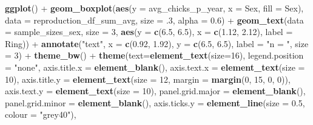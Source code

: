 \documentclass[]{article}
\newenvironment{Shaded}{\begin{snugshade}}{\end{snugshade}}
\newcommand{\KeywordTok}[1]{\textcolor[rgb]{0.13,0.29,0.53}{\textbf{{#1}}}}
\newcommand{\DataTypeTok}[1]{\textcolor[rgb]{0.13,0.29,0.53}{{#1}}}
\newcommand{\DecValTok}[1]{\textcolor[rgb]{0.00,0.00,0.81}{{#1}}}
\newcommand{\FloatTok}[1]{\textcolor[rgb]{0.00,0.00,0.81}{{#1}}}
\newcommand{\StringTok}[1]{\textcolor[rgb]{0.31,0.60,0.02}{{#1}}}
\newcommand{\NormalTok}[1]{{#1}}
\begin{document}
\begin{Shaded}
\begin{Highlighting}[]
\KeywordTok{ggplot}\NormalTok{() +}
\StringTok{  }\KeywordTok{geom_boxplot}\NormalTok{(}\KeywordTok{aes}\NormalTok{(}\DataTypeTok{y =} \NormalTok{avg_chicks_p_year, }\DataTypeTok{x =} \NormalTok{Sex, }\DataTypeTok{fill =} \NormalTok{Sex), }
               \DataTypeTok{data =} \NormalTok{reproduction_df_sum_avg, }\DataTypeTok{size =} \NormalTok{.}\DecValTok{3}\NormalTok{, }\DataTypeTok{alpha =} \FloatTok{0.6}\NormalTok{) +}
\StringTok{  }\KeywordTok{geom_text}\NormalTok{(}\DataTypeTok{data =} \NormalTok{sample_sizes_sex, }\DataTypeTok{size =} \DecValTok{3}\NormalTok{, }
            \KeywordTok{aes}\NormalTok{(}\DataTypeTok{y =} \KeywordTok{c}\NormalTok{(}\FloatTok{6.5}\NormalTok{, }\FloatTok{6.5}\NormalTok{), }\DataTypeTok{x =} \KeywordTok{c}\NormalTok{(}\FloatTok{1.12}\NormalTok{, }\FloatTok{2.12}\NormalTok{), }\DataTypeTok{label =} \NormalTok{Ring)) +}
\StringTok{  }\KeywordTok{annotate}\NormalTok{(}\StringTok{"text"}\NormalTok{, }\DataTypeTok{x =} \KeywordTok{c}\NormalTok{(}\FloatTok{0.92}\NormalTok{, }\FloatTok{1.92}\NormalTok{), }\DataTypeTok{y =} \KeywordTok{c}\NormalTok{(}\FloatTok{6.5}\NormalTok{, }\FloatTok{6.5}\NormalTok{), }\DataTypeTok{label =} \StringTok{"n = "}\NormalTok{, }
           \DataTypeTok{size =} \DecValTok{3}\NormalTok{) +}
\StringTok{  }\KeywordTok{theme_bw}\NormalTok{() +}
\StringTok{  }\KeywordTok{theme}\NormalTok{(}\DataTypeTok{text=}\KeywordTok{element_text}\NormalTok{(}\DataTypeTok{size=}\DecValTok{16}\NormalTok{),}
        \DataTypeTok{legend.position =} \StringTok{"none"}\NormalTok{,}
        \DataTypeTok{axis.title.x =} \KeywordTok{element_blank}\NormalTok{(),}
        \DataTypeTok{axis.text.x  =} \KeywordTok{element_text}\NormalTok{(}\DataTypeTok{size =} \DecValTok{10}\NormalTok{), }
        \DataTypeTok{axis.title.y =} \KeywordTok{element_text}\NormalTok{(}\DataTypeTok{size =} \DecValTok{12}\NormalTok{, }
                                    \DataTypeTok{margin =} \KeywordTok{margin}\NormalTok{(}\DecValTok{0}\NormalTok{, }\DecValTok{15}\NormalTok{, }\DecValTok{0}\NormalTok{, }\DecValTok{0}\NormalTok{)),}
        \DataTypeTok{axis.text.y =} \KeywordTok{element_text}\NormalTok{(}\DataTypeTok{size =} \DecValTok{10}\NormalTok{), }
        \DataTypeTok{panel.grid.major =} \KeywordTok{element_blank}\NormalTok{(),}
        \DataTypeTok{panel.grid.minor =} \KeywordTok{element_blank}\NormalTok{(),}
        \DataTypeTok{axis.ticks.y =} \KeywordTok{element_line}\NormalTok{(}\DataTypeTok{size =} \FloatTok{0.5}\NormalTok{, }\DataTypeTok{colour =} \StringTok{"grey40"}\NormalTok{),}

\end{Highlighting}
\end{Shaded}
\end{document}
